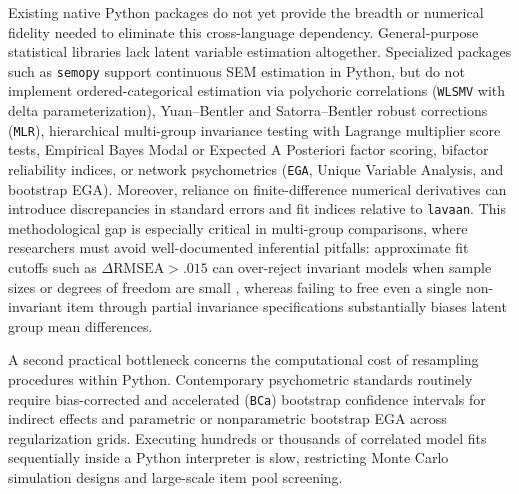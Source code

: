 ﻿\documentclass[12pt,letterpaper]{article}
\begin{document}
Existing native Python packages do not yet provide the breadth or numerical fidelity needed to eliminate this cross-language dependency. General-purpose statistical libraries lack latent variable estimation altogether. Specialized packages such as \texttt{semopy} \parencite{igolkina2020} support continuous SEM estimation in Python, but do not implement ordered-categorical estimation via polychoric correlations (\texttt{WLSMV} with delta parameterization), Yuan--Bentler and Satorra--Bentler robust corrections (\texttt{MLR}), hierarchical multi-group invariance testing with Lagrange multiplier score tests, Empirical Bayes Modal or Expected A Posteriori factor scoring, bifactor reliability indices, or network psychometrics (\texttt{EGA}, Unique Variable Analysis, and bootstrap EGA). Moreover, reliance on finite-difference numerical derivatives can introduce discrepancies in standard errors and fit indices relative to \texttt{lavaan}. This methodological gap is especially critical in multi-group comparisons, where researchers must avoid well-documented inferential pitfalls: approximate fit cutoffs such as $\Delta\mathrm{RMSEA} > .015$ \parencite{chen2007} can over-reject invariant models when sample sizes or degrees of freedom are small \parencite{kenny2015}, whereas failing to free even a single non-invariant item through partial invariance specifications \parencite{byrne1989} substantially biases latent group mean differences.

A second practical bottleneck concerns the computational cost of resampling procedures within Python. Contemporary psychometric standards routinely require bias-corrected and accelerated (\texttt{BCa}) bootstrap confidence intervals for indirect effects \parencite{efron1987} and parametric or nonparametric bootstrap EGA \parencite{christensen2021} across regularization grids. Executing hundreds or thousands of correlated model fits sequentially inside a Python interpreter is slow, restricting Monte Carlo simulation designs and large-scale item pool screening.
\end{document}
